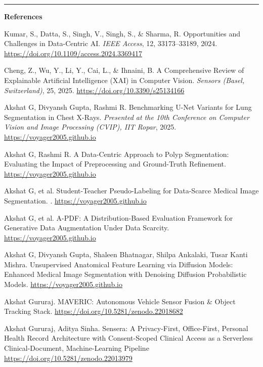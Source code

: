 \documentclass[12pt]{article}
\begin{document}
\vspace{4pt}
\hrule
\vspace{4pt}

{\footnotesize
\textbf{References}
\begin{enumerate}[leftmargin=1.3em, itemsep=1pt, label={[\arabic*]}]
\item \label{ref1} Kumar, S., Datta, S., Singh, V., Singh, S., \& Sharma, R. Opportunities and Challenges in Data-Centric AI. \emph{IEEE Access}, 12, 33173--33189, 2024. \url{https://doi.org/10.1109/access.2024.3369417}
\item \label{ref2} Cheng, Z., Wu, Y., Li, Y., Cai, L., \& Ihnaini, B. A Comprehensive Review of Explainable Artificial Intelligence (XAI) in Computer Vision. \emph{Sensors (Basel, Switzerland)}, 25, 2025. \url{https://doi.org/10.3390/s25134166}
\item \label{ref3} Akshat G, Divyansh Gupta, Rashmi R. Benchmarking U-Net Variants for Lung Segmentation in Chest X-Rays. \emph{Presented at the 10th Conference on Computer Vision and Image Processing (CVIP), IIT Ropar}, 2025. \url{https://voyager2005.github.io}
\item \label{ref4} Akshat G, Rashmi R. A Data-Centric Approach to Polyp Segmentation: Evaluating the Impact of Preprocessing and Ground-Truth Refinement. \url{https://voyager2005.github.io}
\item \label{ref5} Akshat G, et al. Student-Teacher Pseudo-Labeling for Data-Scarce Medical Image Segmentation. \emph{}. \url{https://voyager2005.github.io}
\item \label{ref6} Akshat G, et al. A-PDF: A Distribution-Based Evaluation Framework for Generative Data Augmentation Under Data Scarcity. \url{https://voyager2005.github.io}
\item \label{ref7} Akshat G, Divyansh Gupta, Shaleen Bhatnagar, Shilpa Ankalaki, Tusar Kanti Mishra. Unsupervised Anatomical Feature Learning via Diffusion Models: Enhanced Medical Image Segmentation with Denoising Diffusion Probabilistic Models. \url{https://voyager2005.github.io}
\item \label{ref8} Akshat Gururaj. MAVERIC: Autonomous Vehicle Sensor Fusion \& Object Tracking Stack.
\url{https://doi.org/10.5281/zenodo.22018682}
\item \label{ref9} Akshat Gururaj, Aditya Sinha. Sensera: A Privacy-First, Office-First, Personal Health Record Architecture with Consent-Scoped Clinical Access as a Serverless Clinical-Document, Machine-Learning Pipeline
 \url{https://doi.org/10.5281/zenodo.22013979}

\end{enumerate}}
\end{document}
